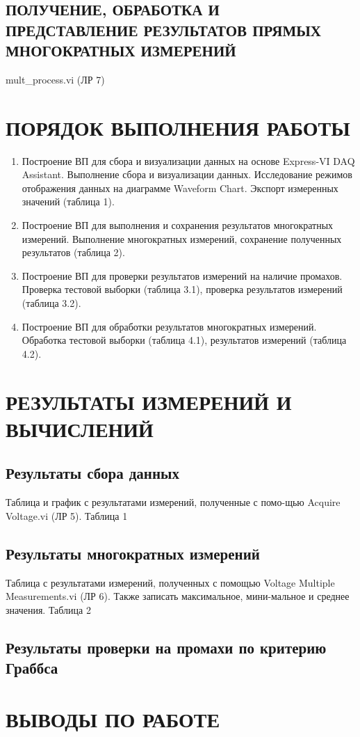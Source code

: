 \documentclass[a4paper,14pt]{article}
\begin{document}
\subsection{ПОЛУЧЕНИЕ, ОБРАБОТКА И ПРЕДСТАВЛЕНИЕ РЕЗУЛЬТАТОВ ПРЯМЫХ МНОГОКРАТНЫХ ИЗМЕРЕНИЙ}
 mult\_process.vi (ЛР 7) 
 
 
\section{ПОРЯДОК ВЫПОЛНЕНИЯ РАБОТЫ}
\begin{enumerate}
\item 	Построение ВП для сбора и визуализации данных на основе Express-VI DAQ Assistant.
 Выполнение сбора и визуализации данных. 
 Исследование режимов отображения данных на диаграмме Waveform Chart. 
 Экспорт измеренных значений (таблица 1).
\item 	Построение ВП для выполнения и сохранения результатов многократных измерений.
 Выполнение многократных измерений, сохранение полученных результатов (таблица 2).
\item 	Построение ВП для проверки результатов измерений на наличие промахов. 
Проверка тестовой выборки (таблица 3.1), проверка результатов измерений (таблица  3.2).
\item 	Построение ВП для обработки результатов многократных измерений. 
Обработка тестовой выборки (таблица 4.1), результатов измерений (таблица 4.2).
\end{enumerate}

\section{ РЕЗУЛЬТАТЫ ИЗМЕРЕНИЙ И ВЫЧИСЛЕНИЙ}

\subsection{Результаты сбора данных}
Таблица и график с результатами измерений, полученные с помо-щью Acquire Voltage.vi (ЛР 5). 
Таблица 1
\subsection{Результаты многократных измерений}

Таблица с результатами измерений, полученных с помощью Voltage Multiple Measurements.vi (ЛР 6). Также записать максимальное, мини-мальное и среднее значения. 
Таблица 2
\subsection{Результаты проверки на промахи по критерию Граббса}

\section{ВЫВОДЫ ПО РАБОТЕ}
\end{document}
